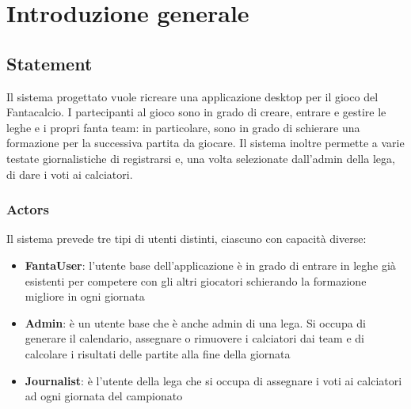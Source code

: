 \section{Introduzione generale}

\subsection{Statement}
Il sistema progettato vuole ricreare una applicazione desktop per il gioco del
Fantacalcio. I partecipanti al gioco sono in grado di creare, entrare e gestire le leghe e i 
propri fanta team: in particolare, sono in grado di schierare una formazione per la successiva partita
da giocare. Il sistema inoltre permette a varie testate giornalistiche di registrarsi e, 
una volta selezionate dall'admin della lega, di dare i voti ai calciatori.
\subsubsection{Actors}
Il sistema prevede tre tipi di utenti distinti, ciascuno con capacità diverse:
\begin{itemize}
    \item \textbf{FantaUser}: l'utente base dell'applicazione è in grado di entrare in leghe già esistenti per
    competere con gli altri giocatori schierando la formazione migliore in ogni giornata
    \item \textbf{Admin}: è un utente base che è anche admin di una lega. Si occupa di generare il calendario,  
    assegnare o rimuovere i calciatori dai team e di calcolare i risultati delle partite alla fine della giornata
    \item \textbf{Journalist}: è l'utente della lega che si occupa di assegnare i voti ai calciatori ad ogni giornata del campionato
\end{itemize}
